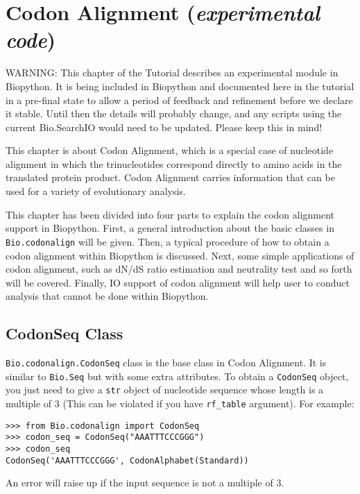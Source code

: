 \chapter{Codon Alignment (\textit{experimental code})}
\label{chap:codonalignment}

WARNING: This chapter of the Tutorial describes an experimental module in
Biopython. It is being included in Biopython and documented here in the
tutorial in a pre-final state to allow a period of feedback and refinement
before we declare it stable. Until then the details will probably change,
and any scripts using the current Bio.SearchIO would need to be updated.
Please keep this in mind!

This chapter is about Codon Alignment, which is a special case of
nucleotide alignment in which the trinucleotides correspond directly to
amino acids in the translated protein product. Codon Alignment carries
information that can be used for a variety of evolutionary analysis.

This chapter has been divided into four parts to explain the codon
alignment support in Biopython. First, a general introduction about the
basic classes in \verb|Bio.codonalign| will be given. Then, a typical
procedure of how to obtain a codon alignment within Biopython is
discussed. Next, some simple applications of codon alignment, such as
dN/dS ratio estimation and neutrality test and so forth will be covered.
Finally, IO support of codon alignment will help user to conduct
analysis that cannot be done within Biopython.

\section{CodonSeq Class}

\verb|Bio.codonalign.CodonSeq| class is the base class in Codon
Alignment. It is similar to \verb|Bio.Seq| but with some extra
attributes. To obtain a \verb|CodonSeq| object, you just need
to give a \verb|str| object of nucleotide sequence whose length is a
multiple of 3 (This can be violated if you have \texttt{rf\_table}
argument). For example:

\begin{verbatim}
>>> from Bio.codonalign import CodonSeq
>>> codon_seq = CodonSeq("AAATTTCCCGGG")
>>> codon_seq
CodonSeq('AAATTTCCCGGG', CodonAlphabet(Standard))
\end{verbatim}

An error will raise up if the input sequence is not a multiple of 3.


